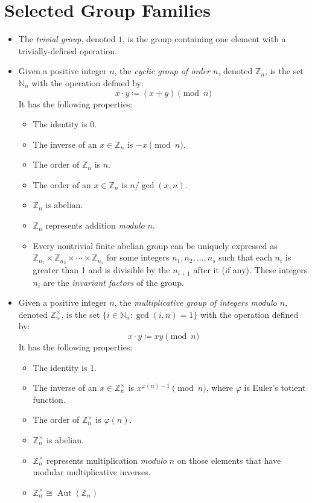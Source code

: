 \documentclass{article}
\newcommand{\N}{\mathbb{N}}
\newcommand{\Z}{\mathbb{Z}}
\DeclareMathOperator{\Aut}{Aut}
\begin{document}
\section{Selected Group Families}
\begin{itemize}
\item The \emph{trivial group}, denoted $1$, is the group containing one element with a trivially-defined operation.

\item Given a positive integer $n$, the \emph{cyclic group of order $n$}, denoted $\Z_n$, is the set $\N_n$ with the operation defined by: $$x\cdot y\coloneqq (x+y)\pmod{n}$$  It has the following properties:
 \begin{itemize}
 \item The identity is 0.
 \item The inverse of an $x\in\Z_n$ is $-x\pmod{n}$.
 \item The order of $\Z_n$ is $n$.
 \item The order of an $x\in\Z_n$ is $n/\gcd(x,n)$.
 \item $\Z_n$ is abelian.
 \item $\Z_n$ represents addition \emph{modulo} $n$.
 \item Every nontrivial finite abelian group can be uniquely expressed as $\Z_{n_1}\times\Z_{n_2}\times\cdots\times\Z_{n_s}$ for some integers $n_1, n_2, \ldots, n_s$ such that each $n_i$ is greater than 1 and is divisible by the $n_{i+1}$ after it (if any).  These integers $n_i$ are the \emph{invariant factors} of the group.
 \end{itemize}

\item Given a positive integer $n$, the \emph{multiplicative group of integers \emph{modulo} $n$}, denoted $\Z_n^\times$, is the set $\{i\in\N_n : \gcd(i,n) = 1\}$ with the operation defined by: $$x\cdot y\coloneqq xy\pmod{n}$$  It has the following properties:
 \begin{itemize}
 \item The identity is 1.
 \item The inverse of an $x\in\Z_n^\times$ is $x^{\varphi(n)-1}\pmod{n}$, where $\varphi$ is Euler's totient function.
 \item The order of $\Z_n^\times$ is $\varphi(n)$.
 \item $\Z_n^\times$ is abelian.
 \item $\Z_n^\times$ represents multiplication \emph{modulo} $n$ on those elements that have modular multiplicative inverses.
 \item $\Z_n^\times \cong \Aut(\Z_n)$
 \end{itemize}


\end{itemize}
\end{document}
